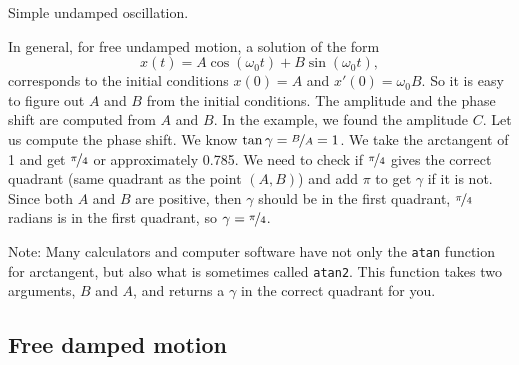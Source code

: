 \begin{mywrapfig}[15]{3.25in}
\capstart
{}
\caption{Simple undamped oscillation.\label{mv:undampedfig}}
\end{mywrapfig}

In general, for free undamped motion, a solution of the
form
\begin{equation*}
x(t) = A \cos (\omega_0 t) + B \sin (\omega_0 t) ,
\end{equation*}
corresponds to the initial conditions $x(0) = A$ and $x'(0) = \omega_0 B$.
So it is easy to figure out $A$ and $B$ from the initial
conditions. 
The amplitude and the phase shift are computed from $A$ and $B$.
In the example, we found the amplitude $C$.  Let us
compute the phase shift.  We know $\tan \gamma = \nicefrac{B}{A} = 1$.
We take the
arctangent of 1 and get $\nicefrac{\pi}{4}$ or approximately 0.785.
We need to check if $\nicefrac{\pi}{4}$ gives the correct quadrant
(same quadrant as the point $(A,B)$)
and add $\pi$ to get $\gamma$ if it is not.
Since both $A$ and $B$ are positive, then $\gamma$ should be in the first
quadrant, $\nicefrac{\pi}{4}$ radians is in the first quadrant, so $\gamma =
\nicefrac{\pi}{4}$.

Note: Many
calculators and computer software have not only the
\texttt{atan} function
for arctangent, but also what is sometimes called \texttt{atan2}.
This function
takes two arguments, $B$ and $A$, and returns a $\gamma$ in the
correct quadrant for you.

\subsection{Free damped motion}


